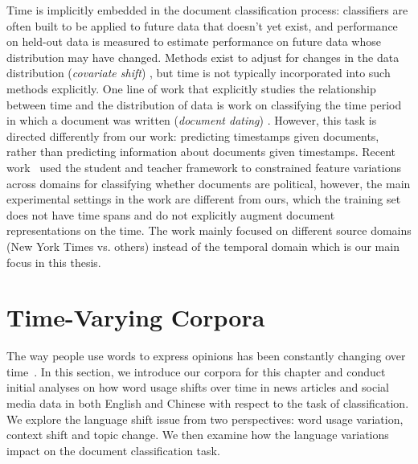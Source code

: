 Time is implicitly embedded in the document classification process: 
classifiers are often built to be applied to future data that doesn't yet exist,
and performance on held-out data is measured to estimate performance on future data whose distribution may have changed.
Methods exist to adjust for changes in the data distribution ({\em covariate shift}) \cite{shimodaira2000improving, bickel2009discriminative},
but time is not typically incorporated into such methods explicitly.
One line of work that explicitly studies the relationship between time and the distribution of data is work on classifying the time period in which a document was written ({\em document dating}) \cite{Kanhabua08, chambers2012labeling, Kotsakos:2014:BAD:2600428.2609495}.
However, this task is directed differently from our work: predicting timestamps given documents, rather than predicting information about documents given timestamps.
Recent work~\cite{desai2019adaptive} used the student and teacher framework to constrained feature variations across domains for classifying whether documents are political, however, the main experimental settings in the work are different from ours, which the training set does not have time spans and do not explicitly augment document representations on the time. The work mainly focused on different source domains (New York Times vs. others) instead of the temporal domain which is our main focus in this thesis.


\section{Time-Varying Corpora}
\label{chap3:sec:data}

The way people use words to express opinions has been constantly changing over time~\cite{mihalcea2012word, kulkarni2015statistically, hamilton2016diachronic}. In this section, we introduce our corpora for this chapter and conduct initial analyses on how word usage shifts over time in news articles and social media data in both English and Chinese with respect to the task of classification. We explore the language shift issue from two perspectives: word usage variation, context shift and topic change. We then examine how the language variations impact on the document classification task.

